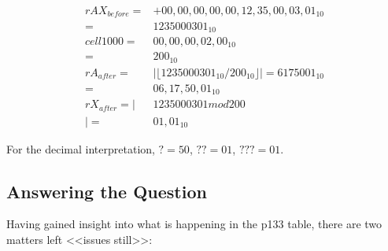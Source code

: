 \documentclass{article}
\begin{document}
\begin{align*}
    rAX_{before} = &+00,00,00,00,00,12,35,00,03,01_{10} \\
    = &1235000301_{10} \\
    cell1000 = &00,00,00,02,00_{10} \\
    = &200_{10} \\
    rA_{after} = &| \lfloor 1235000301_{10} / 200_{10} \rfloor | = 6175001_{10} \\
    = & 06,17,50,01_{10} \\
    rX_{after} = | &1235000301 mod 200 \\ |
    = & 01,01_{10}
\end{align*}

For the decimal interpretation, $? = 50$, $?? = 01$, $??? = 01$.

\subsection*{Answering the Question}

Having gained insight into what is happening in the p133 table,
there are two matters left <<issues still>>: 
\end{document}
